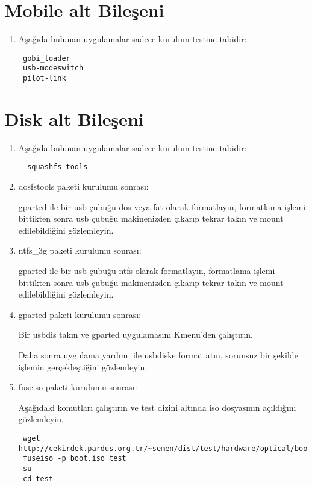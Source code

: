 \documentclass[a4paper,10pt]{article}
\begin{document}
\section{Mobile alt Bileşeni}
\begin{enumerate}
 \item Aşağıda bulunan uygulamalar sadece kurulum testine tabidir:
\begin{verbatim}
 gobi_loader
 usb-modeswitch
 pilot-link
\end{verbatim}

\end{enumerate}

\section{Disk alt Bileşeni}
\begin{enumerate}
 \item Aşağıda bulunan uygulamalar sadece kurulum testine tabidir:
\begin{verbatim}
  squashfs-tools
\end{verbatim}

\item dosfstools paketi kurulumu sonrası:

gparted ile bir usb çubuğu dos veya fat olarak formatlayın, formatlama işlemi bittikten sonra usb çubuğu makinenizden çıkarıp tekrar takın ve mount edilebildiğini gözlemleyin. 

\item ntfs\_3g paketi kurulumu sonrası:

gparted ile bir usb çubuğu ntfs olarak formatlayın, formatlama işlemi bittikten sonra usb çubuğu makinenizden çıkarıp tekrar takın ve mount edilebildiğini gözlemleyin. 

\item gparted paketi kurulumu sonrası:

Bir usbdis takın ve gparted uygulamasını Kmenu'den çalıştırın. 

Daha sonra uygulama yardımı ile usbdiske format atın, sorunsuz bir şekilde işlemin gerçekleştiğini gözlemleyin.
\item fuseiso paketi kurulumu sonrası:

Aşağıdaki komutları çalıştırın ve test dizini altında iso dosyasının açıldığını gözlemleyin.
\begin{verbatim}
 wget http://cekirdek.pardus.org.tr/~semen/dist/test/hardware/optical/boot.iso
 fuseiso -p boot.iso test
 su -
 cd test
\end{verbatim}


\end{enumerate}
\end{document}
